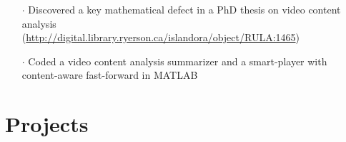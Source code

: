 \documentclass[a4paper, oneside, final]{scrartcl} %
\begin{document}
\begin{center}
\begin{itemize}
    \item[$\cdot$] Discovered a key mathematical defect in a PhD thesis on video content analysis \\(\url{http://digital.library.ryerson.ca/islandora/object/RULA:1465})\\
    \item[$\cdot$] Coded a video content analysis summarizer and a smart-player with content-aware fast-forward in MATLAB\\

  \end{itemize}

  \vspace{-0.2cm}



  \section{Projects}
  \renewcommand{\arraystretch}{1.3}



\end{center}
\end{document}
